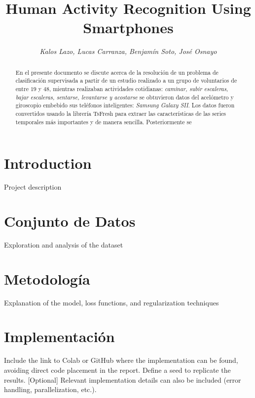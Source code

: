 \documentclass[conference]{IEEEtran}
\begin{document}
    \title{Human Activity Recognition Using Smartphones\\}

    \author{\textit{Kalos Lazo, Lucas Carranza, Benjamín Soto, José Osnayo}}
\maketitle

\begin{abstract}
En el presente documento se discute acerca de la resolución de un problema de clasificación supervisada a partir de un estudio realizado a un grupo de voluntarios de entre $19$ y $48$, mientras realizaban actividades cotidianas: \textit{caminar, subir escaleras, bajar escaleras, sentarse, levantarse y acostarse} se obtuvieron datos del acelómetro y giroscopio embebido sus teléfonos inteligentes: \textit{Samsung Galaxy SII}. Los datos fueron convertidos usando la librería TsFresh para extraer las características de las series temporales más importantes y de manera sencilla. Posteriormente se 
\end{abstract}

\section{Introduction}
Project description

\section{Conjunto de Datos}
Exploration and analysis of the dataset

\section{Metodología}
Explanation of the model, loss functions, and regularization techniques

\section{Implementación}
Include the link to Colab or GitHub where the implementation can be found, avoiding direct
code placement in the report. Define a seed to replicate the results. [Optional] Relevant implementation
details can also be included (error handling, parallelization, etc.).
\end{document}
